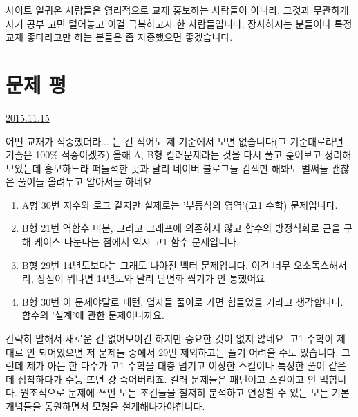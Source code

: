 사이트 일궈온 사람들은 영리적으로 교재 홍보하는 사람들이 아니라, 그것과 무관하게 자기 공부 고민 털어놓고
이걸 극복하고자 한 사람들입니다. 장사하시는 분들이나 특정 교재 좋다라고만 하는 분들은 좀 자중했으면 좋겠습니다.
\vspace{5mm}






\section{문제 평}
\href{https://www.kockoc.com/Apoc/489714}{2015.11.15}

\vspace{5mm}

어떤 교재가 적중했더라... 는 건 적어도 제 기준에서 보면 없습니다(그 기준대로라면 기출은 100$\%$ 적중이겠죠)
올해 A, B형 킬러문제라는 것을 다시 풀고 훑어보고 정리해보았는데
홍보하느라 떠들석한 곳과 달리 네이버 블로그들 검색만 해봐도 벌써들 괜찮은 풀이들 올려두고 알아서들 하네요
\vspace{5mm}
\begin{enumerate}
    \item A형 30번
    지수와 로그 같지만 실제로는 '부등식의 영역'(고1 수학) 문제입니다.
    \vspace{5mm}
    
    \item B형 21번
    역함수 미분, 그리고 그래프에 의존하지 않고 함수의 방정식화로 근을 구해 케이스 나눈다는 점에서 역시 고1 함수 문제입니다.
    \vspace{5mm}
    
    \item B형 29번
    14년도보다는 그래도 나아진 벡터 문제입니다. 이건 너무 오소독스해서리, 장점이 뭐냐면 14년도와 달리 단면화 찍기가 안 통했어요
    \vspace{5mm}
    
    \item B형 30번
    이 문제야말로 패턴, 업자들 풀이로 가면 힘들었을 거라고 생각합니다. 함수의 '설계'에 관한 문제이니까요.
    \vspace{5mm}
\end{enumerate}

간략히 말해서 새로운 건 없어보이긴 하지만 중요한 것이 없지 않네요.
고1 수학이 제대로 안 되어있으면 저 문제들 중에서 29번 제외하고는 풀기 어려울 수도 있습니다.
그런데 제가 아는 한 다수가 고1 수학을 대충 넘기고 이상한 스킬이나 특정한 풀이 같은 데 집착하다가 수능 뜨면 걍 죽어버리죠.
킬러 문제들은 패턴이고 스킬이고 안 먹힙니다. 원초적으로 문제에 쓰인 모든 조건들을 철저히 분석하고
연상할 수 있는 모든 기본 개념들을 동원하면서 모형을 설계해나가야합니다.
\vspace{5mm}

